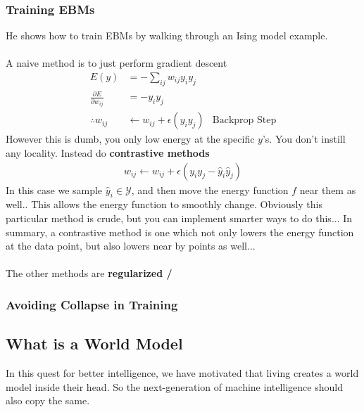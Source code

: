 \begin{itemize}
\subsubsection{Training EBMs}
He shows how to train EBMs by walking through an Ising model example.\\
\\
A naive method is to just perform gradient descent
\begin{align}
	E(y) & = - \sum_{ij} w_{ij} y_i y_j\\
	\frac{\partial E}{\partial w_{ij}} & = - y_i y_j\\
	\therefore w_{ij} & \leftarrow w_{ij} + \epsilon (y_i y_j) & \text{Backprop Step}
\end{align}
However this is dumb, you only low energy at the specific $y$'s. You don't instill any locality. Instead do \textbf{contrastive methods}
\begin{align}
	w_{ij} \leftarrow w_{ij} + \epsilon (y_i y_j - \hat y_i \hat y_j)
\end{align}
In this case we sample $\hat y_i \in \mathcal Y$, and then move the energy function $f$ near them as well.. This allows the energy function to smoothly change. Obviously this particular method is crude, but you can implement smarter ways to do this... In summary, a contrastive method is one which not only lowers the energy function at the data point, but also lowers near by points as well...
\\
\\
The other methods are \textbf{regularized /}

\subsubsection{Avoiding Collapse in Training}




\subsection{What is a World Model}
In this quest for better intelligence, we have motivated that living creates a world model inside their head. So the next-generation of machine intelligence should also copy the same. 


\end{itemize}
